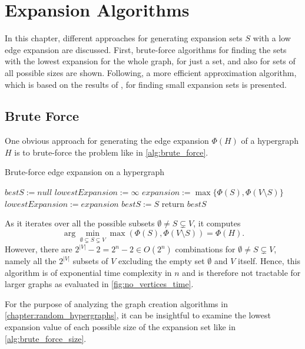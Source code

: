 \chapter{Expansion Algorithms}\label{chapter:algorithms}
In this chapter, different approaches for generating expansion sets $S$ with a low edge expansion are discussed. First, brute-force algorithms for finding the sets with the lowest expansion for the whole graph, %
for just a set,  %
and also for sets of all possible sizes  %
are shown. Following, a more efficient approximation algorithm, which is based on the results of \cite{ChanLTZ16}, for finding small expansion sets is presented.
\section{Brute Force}
One obvious approach for generating the edge expansion $\Phi(H)$ of a hypergraph $H$ is to brute-force the problem like in \cref{alg:brute_force}.
\begin{algorithm}[H]
	\caption{Brute-force edge expansion on a hypergraph \label{alg:brute_force}}
	\begin{algorithmic}
		\State $bestS := null$
		\State $lowestExpansion := \infty$
		\State $expansion :=  \max\{ \Phi(S), \Phi({V\setminus S})\}$
			\State $lowestExpansion := expansion$
			\State $bestS := S$
		\EndIf
		\EndFor	
		\State return $bestS$
		\EndFunction
	\end{algorithmic}
\end{algorithm}
As it iterates over all the possible subsets $\emptyset \neq S \subsetneq V$, it computes \begin{equation}
\arg\min_{\emptyset \subsetneq S \subsetneq V} \max{( \Phi(S), \Phi({V\setminus S}))} = \Phi(H).
\end{equation}
However, there are $2^{|V|}-2 = 2^{n}-2 \in O(2^n) $ combinations for $\emptyset \neq S \subsetneq V$, namely all the $2^{|V|}$ subsets of $V$ excluding the empty set $\emptyset$ and $V$ itself. Hence, this algorithm is of exponential time complexity in $n$ and is therefore not tractable for larger graphs as evaluated in \cref{fig:no_vertices_time}.

For the purpose of analyzing the graph creation algorithms in \cref{chapter:random_hypergraphs}, it can be insightful to examine the lowest expansion value of each possible size of the expansion set like in \cref{alg:brute_force_size}.

